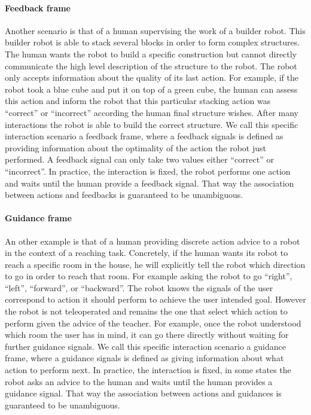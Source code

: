 \paragraph{Feedback frame}
Another scenario is that of a human supervising the work of a builder robot. This builder robot is able to stack several blocks in order to form complex structures. The human wants the robot to build a specific construction but cannot directly communicate the high level description of the structure to the robot. The robot only accepts information about the quality of its last action. For example, if the robot took a blue cube and put it on top of a green cube, the human can assess this action and inform the robot that this particular stacking action was ``correct'' or ``incorrect'' according the human final structure wishes. After many interactions the robot is able to build the correct structure. We call this specific interaction scenario a feedback frame, where a feedback signals is defined as providing information about the optimality of the action the robot just performed. A feedback signal can only take two values either ``correct'' or ``incorrect''. In practice, the interaction is fixed, the robot performs one action and waits until the human provide a feedback signal. That way the association between actions and feedbacks is guaranteed to be unambiguous.

\paragraph{Guidance frame} An other example is that of a human providing discrete action advice to a robot in the context of a reaching task. Concretely, if the human wants its robot to reach a specific room in the house, he will explicitly tell the robot which direction to go in order to reach that room. For example asking the robot to go ``right'', ``left'', ``forward'', or ``backward''. The robot knows the signals of the user correspond to action it should perform to achieve the user intended goal. However the robot is not teleoperated and remains the one that select which action to perform given the advice of the teacher. For example, once the robot understood which room the user has in mind, it can go there directly without waiting for further guidance signals. We call this specific interaction scenario a guidance frame, where a guidance signals is defined as giving information about what action to perform next. In practice, the interaction is fixed, in some states the robot asks an advice to the human and waits until the human provides a guidance signal. That way the association between actions and guidances is guaranteed to be unambiguous.

